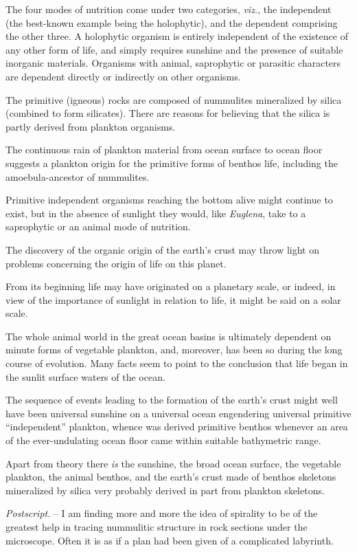 \documentclass[a4paper, 12pt, oneside]{article}
\begin{document}
The four modes of nutrition come under two categories, \emph{viz.}, the independent (the best-known example being the holophytic), and the dependent comprising the other three. A holophytic organism is entirely independent of the existence of any other form of life, and simply requires sunshine and the presence of suitable inorganic materials. Organisms with animal, saprophytic or parasitic characters are dependent directly or indirectly on other organisms.

The primitive (igneous) rocks are composed of nummulites mineralized by silica (combined to form silicates). There are reasons for believing that the silica is partly derived from plankton organisms.

The continuous rain of plankton material from ocean surface to ocean floor suggests a plankton origin for the primitive forms of benthos life, including the amoebula-ancestor of nummulites.

Primitive independent organisms reaching the bottom alive might continue to exist, but in the absence of sunlight they would, like \emph{Euglena}, take to a saprophytic or an animal mode of nutrition.

The discovery of the organic origin of the earth's crust may throw light on problems concerning the origin of life on this planet.

From its beginning life may have originated on a planetary scale, or indeed, in view of the importance of sunlight in relation to life, it might be said on a solar scale.

The whole animal world in the great ocean basins is ultimately dependent on minute forms of vegetable plankton, and, moreover, has been so during the long course of evolution. Many facts seem to point to the conclusion that life began in the sunlit surface waters of the ocean.

The sequence of events leading to the formation of the earth's crust might well have been universal sunshine on a universal ocean engendering universal primitive ``independent'' plankton, whence was derived primitive benthos whenever an area of the ever-undulating ocean floor came within suitable bathymetric range.

Apart from theory there \emph{is} the sunshine, the broad ocean surface, the vegetable plankton, the animal benthos, and the earth's crust made of benthos skeletons mineralized by silica very probably derived in part from plankton skeletons.

\emph{Postscript}. -- I am finding more and more the idea of spirality to be of the greatest help in tracing nummulitic structure in rock sections under the microscope. Often it is as if a plan had been given of a complicated labyrinth.
\end{document}
